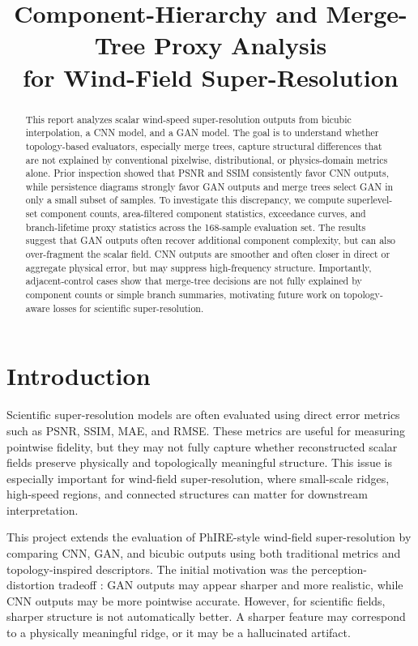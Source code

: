 \documentclass[10pt,conference]{IEEEtran}
\title{Component-Hierarchy and Merge-Tree Proxy Analysis\\
for Wind-Field Super-Resolution}
\author{
\IEEEauthorblockN{Arjun Dadhwal}
\IEEEauthorblockA{
Department of Computer Science\\
Tulane University\\
}
}
\begin{document}
\maketitle

\begin{abstract}
This report analyzes scalar wind-speed super-resolution outputs from bicubic
interpolation, a CNN model, and a GAN model. The goal is to understand whether
topology-based evaluators, especially merge trees, capture structural differences
that are not explained by conventional pixelwise, distributional, or physics-domain
metrics alone. Prior inspection showed that PSNR and SSIM consistently favor CNN
outputs, while persistence diagrams strongly favor GAN outputs and merge trees
select GAN in only a small subset of samples. To investigate this discrepancy, we
compute superlevel-set component counts, area-filtered component statistics,
exceedance curves, and branch-lifetime proxy statistics across the 168-sample
evaluation set. The results suggest that GAN outputs often recover additional
component complexity, but can also over-fragment the scalar field. CNN outputs are
smoother and often closer in direct or aggregate physical error, but may suppress
high-frequency structure. Importantly, adjacent-control cases show that merge-tree
decisions are not fully explained by component counts or simple branch summaries,
motivating future work on topology-aware losses for scientific super-resolution.
\end{abstract}


\section{Introduction}

Scientific super-resolution models are often evaluated using direct error metrics
such as PSNR, SSIM, MAE, and RMSE. These metrics are useful for measuring pointwise
fidelity, but they may not fully capture whether reconstructed scalar fields preserve
physically and topologically meaningful structure. This issue is especially important
for wind-field super-resolution, where small-scale ridges, high-speed regions, and
connected structures can matter for downstream interpretation.

This project extends the evaluation of PhIRE-style wind-field super-resolution
\cite{stengel2020adversarial} by comparing CNN, GAN, and bicubic outputs using both
traditional metrics and topology-inspired descriptors. The initial motivation was the
perception-distortion tradeoff \cite{blau2018perception}: GAN outputs may appear
sharper and more realistic, while CNN outputs may be more pointwise accurate. However,
for scientific fields, sharper structure is not automatically better. A sharper feature
may correspond to a physically meaningful ridge, or it may be a hallucinated artifact.
\end{document}

